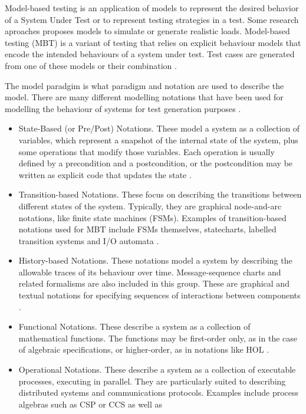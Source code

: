\documentclass{report}
\begin{document}
Model-based testing is an application  of models to represent the desired behavior of a System Under Test or to represent testing strategies in a test. Some research aproaches proposes models to simulate or  generate realistic loads. Model-based testing (MBT) is a variant of testing that relies on explicit behaviour models that encode the intended behaviours of a system under test. Test cases are generated from one of these models or their combination \cite{MarkUtting2012} \cite{Bertolino2008}. 

The model paradgim is what paradigm and notation are used to describe the model. There are many different modelling notations that have been used for modelling the behaviour of systems for test generation purposes \cite{MarkUtting2012} \cite{Hierons2009}. 

\begin{itemize}
\item State-Based (or Pre/Post) Notations. These model a system as a collection of variables, which represent a snapshot of the internal state of the system, plus some operations that modify those variables. Each operation is usually defined by a precondition and a postcondition, or the postcondition may be written as explicit code that updates the state \cite{MarkUtting2012}.
\item Transition-based Notations. These focus on describing the transitions between different states
of the system. Typically, they are graphical node-and-arc notations, like finite state machines
(FSMs). Examples of transition-based notations used for MBT include FSMs themselves, statecharts, labelled transition systems and I/O automata \cite{MarkUtting2012}.
\item History-based Notations. These notations model a system by describing the allowable traces
of its behaviour over time. Message-sequence charts and related formalisms are also included in this group. These are
graphical and textual notations for specifying sequences of interactions between components \cite{MarkUtting2012}.
\item Functional Notations. These describe a system as a collection of mathematical functions. The
functions may be first-order only, as in the case of algebraic specifications, or higher-order, as in
notations like HOL \cite{MarkUtting2012}.
\item Operational Notations. These describe a system as a collection of executable processes,
executing in parallel. They are particularly suited to describing distributed systems and
communications protocols. Examples include process algebras such as CSP or CCS as well as

\end{itemize}
\end{document}
